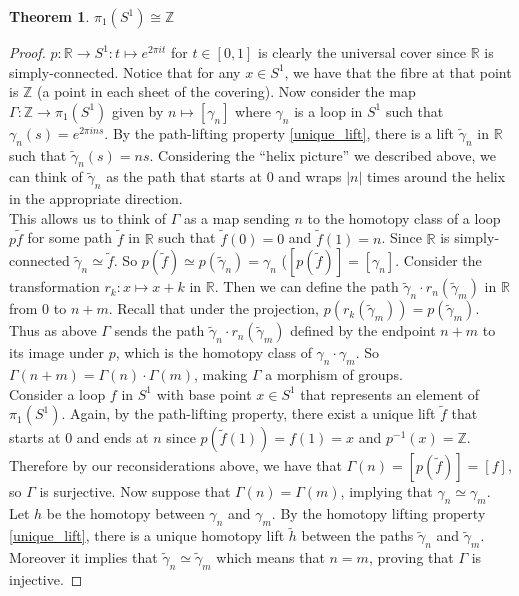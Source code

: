 \documentclass{article}
\theoremstyle{plain}
\newtheorem{theorem}{Theorem}[subsection]
\theoremstyle{definition}
\begin{document}
\begin{theorem}
    $\pi_1(S^1) \cong \mathbb{Z}$
\end{theorem}
\begin{proof}
    $p:\mathbb{R}\rightarrow S^1: t\mapsto e^{2\pi i t}$ for $t\in[0,1]$ is clearly the universal cover since $\mathbb{R}$ is simply-connected.
    Notice that for any $x\in S^1$, we have that the fibre at that point is $\mathbb{Z}$ (a point in each sheet of the covering).
    Now consider the map $\Gamma:\mathbb{Z}\rightarrow \pi_1(S^1)$ given by $n\mapsto [\gamma_n]$
    where $\gamma_n$ is a loop in $S^1$ such that $\gamma_n(s) = e^{2\pi i ns}$.
    By the path-lifting property \ref{unique_lift}, there is a lift $\widetilde{\gamma}_n$ in $\mathbb{R}$ such that $\widetilde{\gamma}_n(s) = ns$.
    Considering the ``helix picture'' we described above, we can think of $\widetilde{\gamma}_n$ as the path that starts at $0$ and wraps $|n|$ times around the helix in the appropriate direction.\\
    This allows us to think of $\Gamma$ as a map sending $n$ to the homotopy class of a loop $p\widetilde{f}$ for some path $\widetilde{f}$ in $\mathbb{R}$ such that $\widetilde{f}(0)=0$ and $\widetilde{f}(1) = n$. 
    Since $\mathbb{R}$ is simply-connected $\widetilde{\gamma}_n \simeq \widetilde{f}$. So $p(\widetilde{f}) \simeq p(\widetilde{\gamma}_n) = \gamma_n$ ($[p(\widetilde{f})] = [\gamma_n]$.
   Consider the transformation $r_k:x \mapsto x+k$ in $\mathbb{R}$. Then we can define the path $\widetilde{\gamma}_n\cdot r_n(\widetilde{\gamma}_m)$ in $\mathbb{R}$ from $0$ to $n+m$. Recall that under the projection, $p(r_k(\widetilde{\gamma}_m)) = p(\widetilde{\gamma}_m)$. 
   Thus as above $\Gamma$ sends the path $\widetilde{\gamma}_n\cdot r_n(\widetilde{\gamma}_m)$ defined by the endpoint $n+m$ to its image under $p$, which is the homotopy class of $\gamma_n\cdot\gamma_m$. So $\Gamma(n+m) = \Gamma(n)\cdot\Gamma(m)$, making $\Gamma$ a morphism of groups.\\
   Consider a loop $f$ in $S^1$ with base point $x\in S^1$ that represents an element of $\pi_1(S^1)$. 
   Again, by the path-lifting property, there exist a unique lift $\widetilde{f}$ that starts at $0$ and ends at $n$ since $p(\widetilde{f}(1)) = f(1) = x$ and $p^{-1}(x) = \mathbb{Z}$. Therefore by our reconsiderations above, we have that $\Gamma(n) = [p(\widetilde{f})] = [f]$, so $\Gamma$ is surjective.
   Now suppose that $\Gamma(n) = \Gamma(m)$, implying that $\gamma_n \simeq\gamma_m$. Let $h$ be the homotopy between $\gamma_n$ and $\gamma_m$. By the homotopy lifting property \ref{unique_lift}, there is a unique homotopy lift $\widetilde{h}$ between the paths $\widetilde{\gamma}_n$ and $\widetilde{\gamma}_m$. Moreover it implies that $\widetilde{\gamma}_n \simeq \widetilde{\gamma}_m$ which means that $n=m$, proving that $\Gamma$ is injective.
\end{proof}
\end{document}
